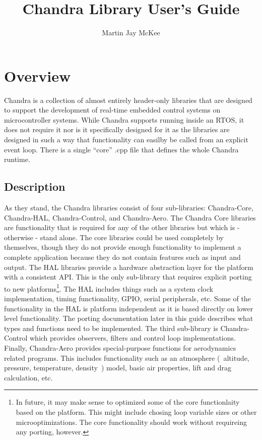 \documentclass[12pt,letterpaper,article]{memoir} %
\title{Chandra Library User's Guide}
\author{Martin Jay McKee}
\begin{document}

\maketitle
\tableofcontents* %

\chapter{Overview}
Chandra is a collection of almost entirely header-only libraries that are designed to support the development of real-time embedded control systems on microcontroller systems.  While Chandra supports running inside an RTOS, it does not require it nor is it specifically designed for it as the libraries are designed in such a way that functionality can easilby be called from an explicit event loop.  There is a single ``core'' .cpp file that defines the whole Chandra runtime.

\section{Description}
As they stand, the Chandra libraries consist of four sub-libraries: Chandra-Core, Chandra-HAL, Chandra-Control, and Chandra-Aero.  The Chandra Core libraries are functionality that is required for any of the other libraries but which is - otherwise - stand alone.  The core libraries could be used completely by themselves, though they do not provide enough functionality to implement a complete application because they do not contain features such as input and output.  The HAL libraries provide a hardware abstraction layer for the platform with a consistent API.  This is the only sub-library that requires explicit porting to new platforms\footnote{In future, it may make sense to optimized some of the core functionlaity based on the platform.  This might include chosing loop variable sizes or other microoptimizations.  The core functionality should work without requireing any porting, however.}.  The HAL includes things such as a system clock implementation, timing functionality, GPIO, serial peripherals, etc.  Some of the functionality in the HAL is platform independent as it is based directly on lower level functionality.  The porting documentation later in this guide describes what types and functions need to be implemented.  The third sub-library is Chandra-Control which provides observers, filters and control loop implementations.  Finally, Chandra-Aero provides special-purpose functions for aerodynamics related programs.  This includes functionality such as an atmosphere (~altitude, pressure, temperature, density~) model, basic air properties, lift and drag calculation, etc.
\end{document}
